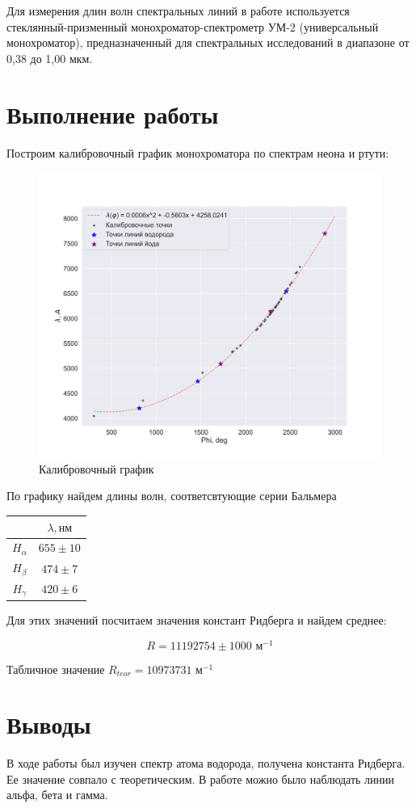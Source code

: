 \documentclass[a4paper, 12pt]{article}
\begin{document}
Для измерения длин волн спектральных линий в работе используется стеклянный-призменный монохроматор-спектрометр УМ-2 (универсальный монохроматор), предназначенный для спектральных исследований в диапазоне от 0,38 до 1,00 мкм. 

\section{Выполнение работы}
Построим калибровочный график монохроматора по спектрам неона и ртути:

\begin{figure}[H]
    \centering
    \includegraphics[width=1\textwidth]{plot1.png}
    \caption{Калибровочный график}
    \label{fig:cal}
\end{figure}

По графику найдем длины волн, соответсвтующие серии Бальмера

\begin{table}[H]
	\centering
	\begin{tabular}{|c|c|}
	\hline
			   & $\lambda, \text{нм}$ \\ \hline
	$H_\alpha$ & $655 \pm 10$          \\ \hline
	$H_\beta$  & $474 \pm 7$          \\ \hline
	$H_\gamma$ & $420 \pm 6$         \\ \hline
	\end{tabular}
\end{table}

Для этих значений посчитаем значения констант Ридберга и найдем среднее:

\begin{equation}
	R = 11192754 \pm 1000 \text{ м}^{-1}
\end{equation}

Табличное значение $R_{teor} = 10973731 \text{ м}^{-1}$

\section{Выводы}
В ходе работы был изучен спектр атома водорода, получена константа Ридберга. Ее значение совпало с теоретическим. В работе можно было наблюдать линии альфа, бета и гамма.
\end{document}
